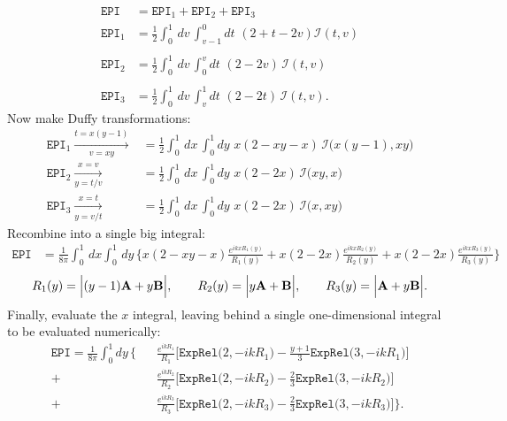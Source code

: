 \documentclass[letterpaper]{article}
\begin{document}
\begin{align*}
  \texttt{EPI}
&=\texttt{EPI}_1 + \texttt{EPI}_2 + \texttt{EPI}_3
\\[5pt]
  \texttt{EPI}_1
&=\frac{1}{2}\int_0^1\,dv\,\int_{v-1}^0 dt \,\, (2+t-2v)\mathcal{I}(t,v) \\
\\
  \texttt{EPI}_2
&=\frac{1}{2}\int_0^1\,dv\,\int_{0}^v dt \,\, (2-2v) \, \mathcal{I}(t,v) \\
\\
  \texttt{EPI}_3
&=\frac{1}{2}\int_0^1\,dv\,\int_v^1 dt \,\, (2-2t) \, \mathcal{I}(t,v).
\end{align*}
Now make Duffy transformations:
\begin{align*}
  \texttt{EPI}_1
  \xrightarrow[v=xy]{t=x(y-1)}
&=\frac{1}{2}\int_0^1\,dx\,\int_0^1 dy \,\, 
              x(2-xy-x)\,\mathcal{I}\Big(x(y-1),xy\Big)
\\[5pt]
  \texttt{EPI}_2
  \xrightarrow[y=t/v]{x=v}
&=\frac{1}{2}\int_0^1\,dx\,\int_0^1 dy \,\, 
              x(2-2x)\,\mathcal{I}\Big(xy,x\Big)
\\[5pt]
  \texttt{EPI}_3
  \xrightarrow[y=v/t]{x=t}
&=\frac{1}{2}\int_0^1\,dx\,\int_0^1 dy \,\, 
              x(2-2x)\,\mathcal{I}\Big(x,xy\Big)
\end{align*}
Recombine into a single big integral:
\begin{align*}
 \texttt{EPI}
&=\frac{1}{8\pi}\int_0^1 \, dx \int_0^1 \, dy \, 
 \Big\{  x(2-xy-x)\frac{e^{ikxR_1(y)}}{R_1(y)}
        +x(2-2x)\frac{e^{ikxR_2(y)}}{R_2(y)}
        +x(2-2x)\frac{e^{ikxR_3(y)}}{R_3(y)}
 \Big\}
\end{align*}
$$
 R_1(y) = \Big|(y-1)\mathbf{A} + y\mathbf{B}\Big|, 
 \qquad 
 R_2(y) = \Big|y\mathbf{A} + \mathbf{B}\Big|, 
 \qquad 
 R_3(y) = \Big|\mathbf{A} + y\mathbf{B}\Big|.
$$
Finally, evaluate the $x$ integral, leaving behind
a single one-dimensional integral to be evaluated
numerically:
\begin{align*}
 \texttt{EPI}=\frac{1}{8\pi}\int_0^1 dy \, \Bigg\{ 
\,\,\,\,\,
&\frac{e^{ikR_1}}{R_1}
 \Big[  \texttt{ExpRel}\big(2,-ikR_1\big)
       -\frac{y+1}{3} \texttt{ExpRel}\big(3,-ikR_1\big)
 \Big]
\\
+&\frac{e^{ikR_2}}{R_2}
 \Big[  \texttt{ExpRel}\big(2,-ikR_2\big)
       -\frac{2}{3} \texttt{ExpRel}\big(3,-ikR_2\big)
 \Big]
\\
+&\frac{e^{ikR_3}}{R_3}
 \Big[  \texttt{ExpRel}\big(2,-ikR_3\big)
       -\frac{2}{3} \texttt{ExpRel}\big(3,-ikR_3\big)
 \Big]\Bigg\}.
\end{align*}
\end{document}
